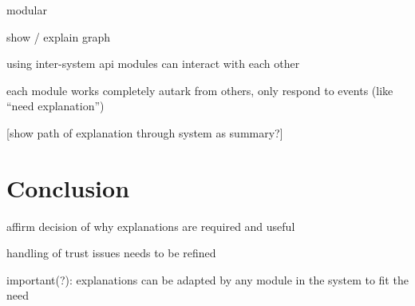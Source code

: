\documentclass[a4paper]{article}
\begin{document}
modular

show / explain graph

using inter-system api modules can interact with each other

each module works completely autark from others, only respond to events (like “need explanation”)

[show path of explanation through system as summary?]

\section{Conclusion}

affirm decision of why explanations are required and useful

handling of trust issues needs to be refined

important(?): explanations can be adapted by any module in the system to fit the need

\newpage


\end{document}
